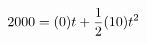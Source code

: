 \documentclass[preview]{standalone}
\begin{document}
\begin{align*}
\special{dvisvgm:raw <g id='unique000'>}2000 = (0)t + \frac{1}{2} (10) t^2\special{dvisvgm:raw </g>}
\end{align*}
\end{document}
